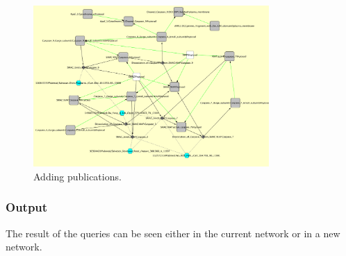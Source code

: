 \begin{itemize}
\begin{figure}
\centering
\includegraphics[width=0.8\textwidth]{graphics/ebo_smac_publications}
\caption{Adding publications.}
\label{Standard_Query_Adding_publications}
\end{figure}

\end{itemize}

\subsubsection{Output}
The result of the queries can be seen either in the current network or in a new network.


